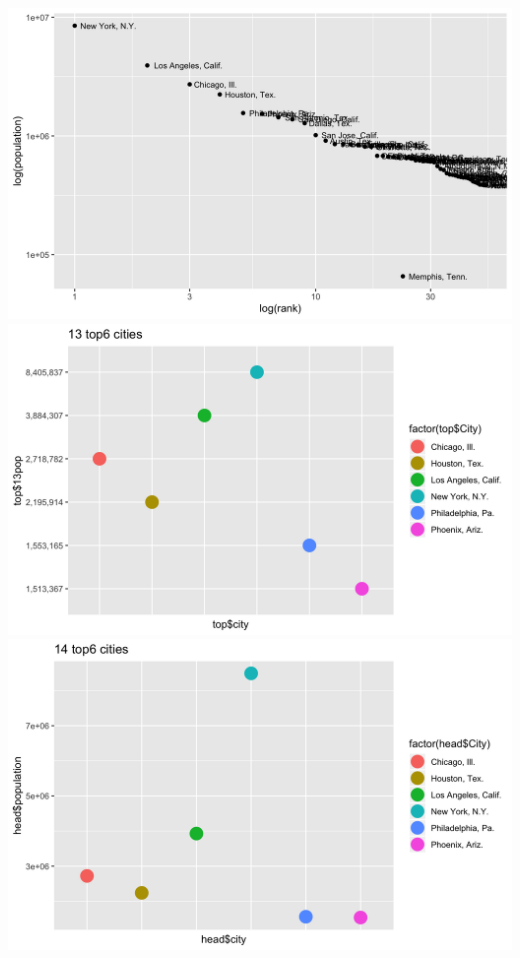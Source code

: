 \documentclass{article}
\begin{document}
\includegraphics{PS6a_Gao.png}
\includegraphics{PS6b_Gao.png}
\includegraphics{PS6c_Gao.png}
\end{document}
